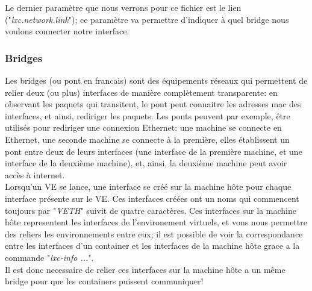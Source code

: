 Le dernier param\`etre que nous verrons pour ce fichier est le lien ("\emph{lxc.network.link}"); ce param\`etre
va permettre d'indiquer \`a quel bridge nous voulons connecter notre interface.\\


\subsubsection{Bridges}
Les bridges (ou pont en francais) sont des \'equipements r\'eseaux qui permettent de relier deux (ou plus)
interfaces de mani\`ere compl\`etement transparente: en observant les paquets qui transitent, le pont peut 
connaitre les adresses mac des interfaces, et ainsi, rediriger les paquets. Les ponts peuvent par exemple,
\^etre utilis\'es pour rediriger une connexion Ethernet: une machine se connecte en Ethernet, une seconde 
machine se connecte \`a la premi\`ere, elles \'etablissent un pont entre deux de leurs interfaces (une interface
de la premi\`ere machine, et une interface de la deuxi\`eme machine), et, ainsi, la deuxi\`eme machine peut 
avoir acc\`es \`a internet.\\

Lorsqu'un VE se lance, une interface se cr\'e\'e sur la machine h\^ote pour chaque interface pr\'esente sur le VE. Ces interfaces cr\'e\'ees ont un noms qui commencent toujours par "\emph{VETH}" suivit de quatre caract\`eres. Ces interfaces sur la machine h\^ote representent les interfaces de l'environement virtuels, et vons nous permettre des reliers les environnements entre eux; il est possible de voir la correspondance entre les interfaces d'un container et les interfaces de la machine h\^ote grace a la commande "\emph{lxc-info ...}".\\

Il est donc necessaire de relier ces interfaces sur la machine h\^ote a un m\^eme bridge pour que les containers puissent communiquer!


